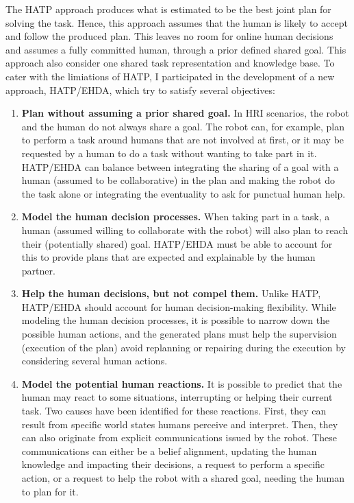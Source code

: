 The HATP approach produces what is estimated to be the best joint plan for solving the task. Hence, this approach assumes that the human is likely to accept and follow the produced plan. This leaves no room for online human decisions and assumes a fully committed human, through a prior defined shared goal. This approach also consider one shared task representation and knowledge base. To cater with the limiations of HATP, I participated in the development of a new approach, HATP/EHDA, which try to satisfy several objectives: 
\begin{enumerate}
    \item \textbf{Plan without assuming a prior shared goal.} In HRI scenarios, the robot and the human do not always share a goal. The robot can, for example, plan to perform a task around humans that are not involved at first, or it may be requested by a human to do a task without wanting to take part in it. HATP/EHDA can balance between integrating the sharing of a goal with a human (assumed to be collaborative) in the plan and making the robot do the task alone or integrating the eventuality to ask for punctual human help. 

    \item \textbf{Model the human decision processes.} When taking part in a task, a human (assumed willing to collaborate with the robot) will also plan to reach their (potentially shared) goal. HATP/EHDA must be able to account for this to provide plans that are expected and explainable by the human partner.

    \item \textbf{Help the human decisions, but not compel them.} Unlike HATP, HATP/EHDA should account for human decision-making flexibility. While modeling the human decision processes, it is possible to narrow down the possible human actions, and the generated plans must help the supervision (execution of the plan) avoid replanning or repairing during the execution by considering several human actions.

    \item \textbf{Model the potential human reactions.} It is possible to predict that the human may react to some situations, interrupting or helping their current task. Two causes have been identified for these reactions. First, they can result from specific world states humans perceive and interpret. Then, they can also originate from explicit communications issued by the robot. These communications can either be a belief alignment, updating the human knowledge and impacting their decisions, a request to perform a specific action, or a request to help the robot with a shared goal, needing the human to plan for it.


\end{enumerate}
